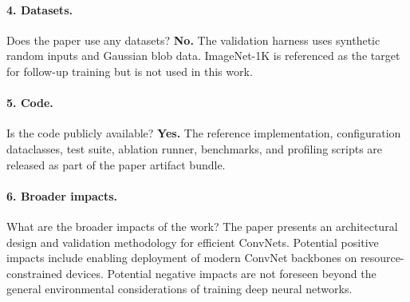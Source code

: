 \documentclass{article}
\begin{document}
\paragraph{4. Datasets.}
Does the paper use any datasets?
\textbf{No.}  The validation harness uses synthetic random inputs and
Gaussian blob data.  ImageNet-1K is referenced as the target for
follow-up training but is not used in this work.

\paragraph{5. Code.}
Is the code publicly available?
\textbf{Yes.}  The reference implementation, configuration dataclasses,
test suite, ablation runner, benchmarks, and profiling scripts are
released as part of the paper artifact bundle.

\paragraph{6. Broader impacts.}
What are the broader impacts of the work?
The paper presents an architectural design and validation methodology
for efficient ConvNets.  Potential positive impacts include enabling
deployment of modern ConvNet backbones on resource-constrained devices.
Potential negative impacts are not foreseen beyond the general
environmental considerations of training deep neural networks.
\end{document}
